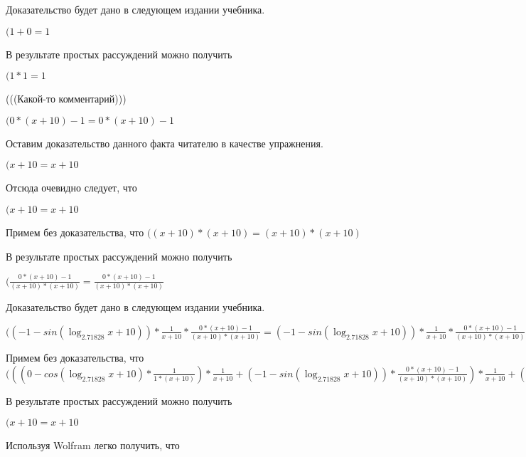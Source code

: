 \documentclass[12pt,a4paper,fleqn]{article}
\theoremstyle{definition}
\begin{document}
Доказательство будет дано в следующем издании учебника.

$( 1  +  0  =  1 $

В результате простых рассуждений можно получить

$( 1  *  1  =  1 $

(((Какой-то комментарий)))

$( 0  * ( x  +  10 ) -  1  =  0  * ( x  +  10 ) -  1 $

Оставим доказательство данного факта читателю в качестве упражнения.

$( x  +  10  =  x  +  10 $

Отсюда очевидно следует, что

$( x  +  10  =  x  +  10 $

Примем без доказательства, что
$(( x  +  10 ) * ( x  +  10 ) = ( x  +  10 ) * ( x  +  10 )$

В результате простых рассуждений можно получить

$(\frac{ 0  * ( x  +  10 ) -  1 }{( x  +  10 ) * ( x  +  10 )}
 = \frac{ 0  * ( x  +  10 ) -  1 }{( x  +  10 ) * ( x  +  10 )}
$

Доказательство будет дано в следующем издании учебника.

$(( -1  - sin(\log_{ 2.71828 }{ x  +  10 })) * \frac{ 1 }{ x  +  10 }
 * \frac{ 0  * ( x  +  10 ) -  1 }{( x  +  10 ) * ( x  +  10 )}
 = ( -1  - sin(\log_{ 2.71828 }{ x  +  10 })) * \frac{ 1 }{ x  +  10 }
 * \frac{ 0  * ( x  +  10 ) -  1 }{( x  +  10 ) * ( x  +  10 )}
$

Примем без доказательства, что
$((( 0  - cos(\log_{ 2.71828 }{ x  +  10 }) * \frac{ 1 }{ 1  * ( x  +  10 )}
) * \frac{ 1 }{ x  +  10 }
 + ( -1  - sin(\log_{ 2.71828 }{ x  +  10 })) * \frac{ 0  * ( x  +  10 ) -  1 }{( x  +  10 ) * ( x  +  10 )}
) * \frac{ 1 }{ x  +  10 }
 + ( -1  - sin(\log_{ 2.71828 }{ x  +  10 })) * \frac{ 1 }{ x  +  10 }
 * \frac{ 0  * ( x  +  10 ) -  1 }{( x  +  10 ) * ( x  +  10 )}
 = (( 0  - cos(\log_{ 2.71828 }{ x  +  10 }) * \frac{ 1 }{ 1  * ( x  +  10 )}
) * \frac{ 1 }{ x  +  10 }
 + ( -1  - sin(\log_{ 2.71828 }{ x  +  10 })) * \frac{ 0  * ( x  +  10 ) -  1 }{( x  +  10 ) * ( x  +  10 )}
) * \frac{ 1 }{ x  +  10 }
 + ( -1  - sin(\log_{ 2.71828 }{ x  +  10 })) * \frac{ 1 }{ x  +  10 }
 * \frac{ 0  * ( x  +  10 ) -  1 }{( x  +  10 ) * ( x  +  10 )}
$

В результате простых рассуждений можно получить

$( x  +  10  =  x  +  10 $

Используя Wolfram легко получить, что
\end{document}
